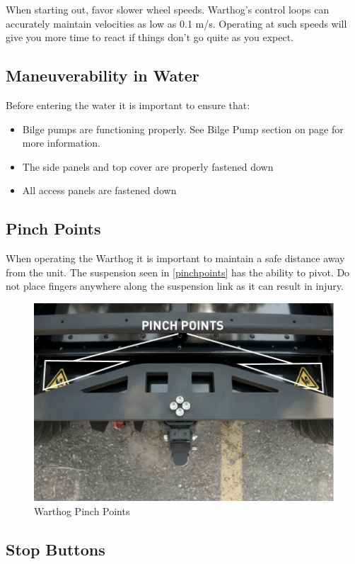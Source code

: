 \documentclass[]{clearpath-latex/clearpath-manual}
\begin{document}
When starting out, favor slower wheel speeds. Warthog's control loops can accurately maintain velocities as low as 0.1 m/s. Operating at such speeds will give you more time to react if things don’t go quite as you expect.

\subsection{Maneuverability in Water}

Before entering the water it is important to ensure that:

\begin{itemize}[nolistsep]
  \item Bilge pumps are functioning properly.  See Bilge Pump section on page \pageref{bilgepumps} for more information.
  \item The side panels and top cover are properly fastened down
  \item All access panels are fastened down
\end{itemize}


\subsection{Pinch Points}

When operating the Warthog  it is important to maintain a safe distance away from the unit. The suspension seen in \autoref{pinchpoints} has the ability to pivot.  Do not place fingers anywhere along the suspension link as it can result in injury.

\begin{figure}[!htb]
  \centering
  \includegraphics[width=0.75\linewidth]{Warthog_pinch_points.jpg}
  \caption{Warthog Pinch Points}
  \label{pinchpoints}
\end{figure}

\pagebreak[4]
\subsection{Stop Buttons}
\end{document}
